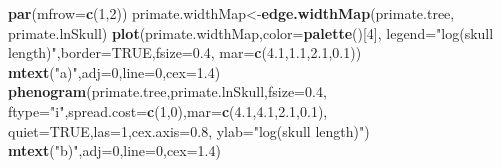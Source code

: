 \documentclass[fleqn,10pt,lineno]{wlpeerj} %
\newenvironment{Shaded}{\begin{snugshade}}{\end{snugshade}}
\newcommand{\AttributeTok}[1]{\textcolor[rgb]{0.13,0.29,0.53}{#1}}
\newcommand{\ConstantTok}[1]{\textcolor[rgb]{0.56,0.35,0.01}{#1}}
\newcommand{\DecValTok}[1]{\textcolor[rgb]{0.00,0.00,0.81}{#1}}
\newcommand{\FloatTok}[1]{\textcolor[rgb]{0.00,0.00,0.81}{#1}}
\newcommand{\FunctionTok}[1]{\textcolor[rgb]{0.13,0.29,0.53}{\textbf{#1}}}
\newcommand{\NormalTok}[1]{#1}
\newcommand{\OtherTok}[1]{\textcolor[rgb]{0.56,0.35,0.01}{#1}}
\newcommand{\StringTok}[1]{\textcolor[rgb]{0.31,0.60,0.02}{#1}}
\begin{document}
\begin{Shaded}
\begin{Highlighting}[]
\FunctionTok{par}\NormalTok{(}\AttributeTok{mfrow=}\FunctionTok{c}\NormalTok{(}\DecValTok{1}\NormalTok{,}\DecValTok{2}\NormalTok{))}
\NormalTok{primate.widthMap}\OtherTok{\textless{}{-}}\FunctionTok{edge.widthMap}\NormalTok{(primate.tree,}
\NormalTok{  primate.lnSkull)}
\FunctionTok{plot}\NormalTok{(primate.widthMap,}\AttributeTok{color=}\FunctionTok{palette}\NormalTok{()[}\DecValTok{4}\NormalTok{],}
  \AttributeTok{legend=}\StringTok{"log(skull length)"}\NormalTok{,}\AttributeTok{border=}\ConstantTok{TRUE}\NormalTok{,}\AttributeTok{fsize=}\FloatTok{0.4}\NormalTok{,}
  \AttributeTok{mar=}\FunctionTok{c}\NormalTok{(}\FloatTok{4.1}\NormalTok{,}\FloatTok{1.1}\NormalTok{,}\FloatTok{2.1}\NormalTok{,}\FloatTok{0.1}\NormalTok{))}
\FunctionTok{mtext}\NormalTok{(}\StringTok{"a)"}\NormalTok{,}\AttributeTok{adj=}\DecValTok{0}\NormalTok{,}\AttributeTok{line=}\DecValTok{0}\NormalTok{,}\AttributeTok{cex=}\FloatTok{1.4}\NormalTok{)}
\FunctionTok{phenogram}\NormalTok{(primate.tree,primate.lnSkull,}\AttributeTok{fsize=}\FloatTok{0.4}\NormalTok{,}
  \AttributeTok{ftype=}\StringTok{"i"}\NormalTok{,}\AttributeTok{spread.cost=}\FunctionTok{c}\NormalTok{(}\DecValTok{1}\NormalTok{,}\DecValTok{0}\NormalTok{),}\AttributeTok{mar=}\FunctionTok{c}\NormalTok{(}\FloatTok{4.1}\NormalTok{,}\FloatTok{4.1}\NormalTok{,}\FloatTok{2.1}\NormalTok{,}\FloatTok{0.1}\NormalTok{),}
  \AttributeTok{quiet=}\ConstantTok{TRUE}\NormalTok{,}\AttributeTok{las=}\DecValTok{1}\NormalTok{,}\AttributeTok{cex.axis=}\FloatTok{0.8}\NormalTok{,}
  \AttributeTok{ylab=}\StringTok{"log(skull length)"}\NormalTok{)}
\FunctionTok{mtext}\NormalTok{(}\StringTok{"b)"}\NormalTok{,}\AttributeTok{adj=}\DecValTok{0}\NormalTok{,}\AttributeTok{line=}\DecValTok{0}\NormalTok{,}\AttributeTok{cex=}\FloatTok{1.4}\NormalTok{)}
\end{Highlighting}
\end{Shaded}
\end{document}

